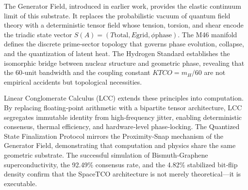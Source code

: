 \documentclass[reprint,amsmath,amssymb,aps,prl,floatfix]{revtex4-2}
\begin{document}
The Generator Field, introduced in earlier work, provides the elastic continuum limit of this substrate. It replaces the probabilistic vacuum of quantum field theory with a deterministic tensor field whose tension, torsion, and shear encode the triadic state vector \(S(A) = (T{\mathrm{total}}, E{\mathrm{grid}}, \phi{\mathrm{phase}})\). The M46 manifold defines the discrete prime‑sector topology that governs phase evolution, collapse, and the quantization of latent heat. The Hydrogen Standard establishes the isomorphic bridge between nuclear structure and geometric phase, revealing that the 60‑unit bandwidth and the coupling constant \(K{TCO} = m_H/60\) are not empirical accidents but topological necessities.
\medskip

Linear Conglomerate Calculus (LCC) extends these principles into computation. By replacing floating‑point arithmetic with a bipartite tensor architecture, LCC segregates immutable identity from high‑frequency jitter, enabling deterministic consensus, thermal efficiency, and hardware‑level phase‑locking. The Quantized State Finalization Protocol mirrors the Proximity‑Snap mechanism of the Generator Field, demonstrating that computation and physics share the same geometric substrate. The successful simulation of Bismuth‑Graphene superconductivity, the 92.49\% consensus rate, and the 4.82\% stabilized bit‑flip density confirm that the SpaceTCO architecture is not merely theoretical—it is executable.
\medskip
\end{document}
